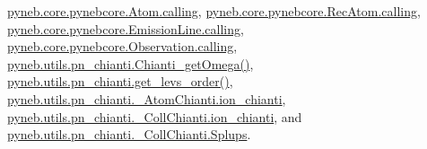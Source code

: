 \hyperlink{pynebcore_8py_source_l01175}{pyneb.\+core.\+pynebcore.\+Atom.\+calling}, \hyperlink{pynebcore_8py_source_l02572}{pyneb.\+core.\+pynebcore.\+Rec\+Atom.\+calling}, \hyperlink{pynebcore_8py_source_l03263}{pyneb.\+core.\+pynebcore.\+Emission\+Line.\+calling}, \hyperlink{pynebcore_8py_source_l03419}{pyneb.\+core.\+pynebcore.\+Observation.\+calling}, \hyperlink{pn__chianti_8py_source_l00107}{pyneb.\+utils.\+pn\+\_\+chianti.\+Chianti\+\_\+get\+Omega()}, \hyperlink{pn__chianti_8py_source_l00043}{pyneb.\+utils.\+pn\+\_\+chianti.\+get\+\_\+levs\+\_\+order()}, \hyperlink{pn__chianti_8py_source_l00222}{pyneb.\+utils.\+pn\+\_\+chianti.\+\_\+\+Atom\+Chianti.\+ion\+\_\+chianti}, \hyperlink{pn__chianti_8py_source_l00413}{pyneb.\+utils.\+pn\+\_\+chianti.\+\_\+\+Coll\+Chianti.\+ion\+\_\+chianti}, and \hyperlink{pn__chianti_8py_source_l00431}{pyneb.\+utils.\+pn\+\_\+chianti.\+\_\+\+Coll\+Chianti.\+Splups}.


